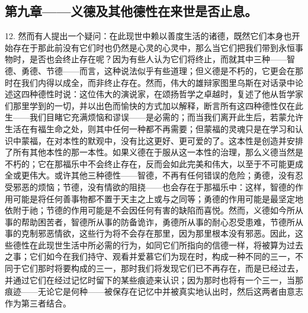
\subsection{第九章——义德及其他德性在来世是否止息。}

12. 然而有人提出一个疑问：在此现世中赖以善度生活的诸德，既然它们本身也开始存在于那此前没有它们时也仍然是心灵的心灵中，那么当它们把我们带到永恒事物时，是否也会终止存在呢？因为有些人认为它们将终止，而就其中三种——智德、勇德、节德——而言，这种说法似乎有些道理；但义德是不朽的，它更会在那时在我们内得以成全，而非终止存在。然而，伟大的雄辩家图里乌斯在对话录中论述这四种德性时说：这位伟大的演说家，在颂扬哲学之卓越时，复述了他从哲学家们那里学到的一切，并以出色而愉快的方式加以解释，断言所有这四种德性仅在此生——我们目睹它充满烦恼和谬误——是必需的；而当我们离开此生后，若蒙允许生活在有福生命之处，则其中任何一种都不再需要；但蒙福的灵魂只是在学习和认识中蒙福，在对本性的默观中，没有比这更好、更可爱的了。这本性是创造并安排了所有其他本性的那一本性。如果义德在于服从这一本性的治理，那么义德当然是不朽的；它在那福乐中不会终止存在，反而会如此完美和伟大，以至于不可能更成全或更伟大。或许其他三种德性——智德，不再有任何错误的危险；勇德，没有忍受邪恶的烦恼；节德，没有情欲的阻挠——也会存在于那福乐中：这样，智德的作用可能是将任何善事物都不置于天主之上或与之同等；勇德的作用可能是最坚定地依附于祂；节德的作用可能是不会因任何有害的缺陷而喜悦。然而，义德如今所从事的帮助困苦者，智德所从事的防备诡诈，勇德所从事的耐心忍受患难，节德所从事的克制邪恶情欲，这些行为将不会存在那里，因为那里根本没有邪恶。因此，这些德性在此现世生活中所必需的行为，如同它们所指向的信德一样，将被算为过去之事；它们如今在我们持守、观看并爱慕它们为现在时，构成一种不同的三一，不同于它们那时将要构成的三一，那时我们将发现它们已不再存在，而是已经过去，并通过它们在经过记忆时留下的某些痕迹来认识；因为那时也将有一个三一，当那痕迹——无论它是何种——被保存在记忆中并被真实地认出时，然后这两者由意志作为第三者结合。\par


